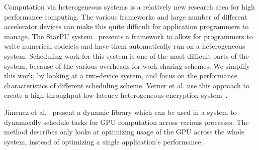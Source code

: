 \documentclass[journal]{IEEEtran}
\begin{document}
Computation via heterogeneous systems is a relatively new research area for
high performance computing.  The various frameworks and large number of
different accelerator devices can make this quite difficult for application
programmers to manage.  The StarPU system~\cite{Augonnet2009} presents a 
framework to allow for programmers to write numerical codelets and have them
automatically run on a heterogeneous system.  Scheduling work for this system
is one of the most difficult parts of the system, because of the various
overheads for work-sharing schemes. We simplify this work, by looking at a
two-device system, and focus on the performance characteristics of different
scheduling scheme.  Verner et al. use this approach to create a high-throughput
low-latency heterogeneous encryption system~\cite{Verner2011}. 

Jimenez et al.~\cite{Jimenez2009} present a dynamic library which can be used
in a system to dynamically schedule tasks for GPU computation across various
processes. The method describes only looks at optimizing usage of the GPU across
the whole system, instead of optimizing a single application's performance.

%
%

\end{document}
